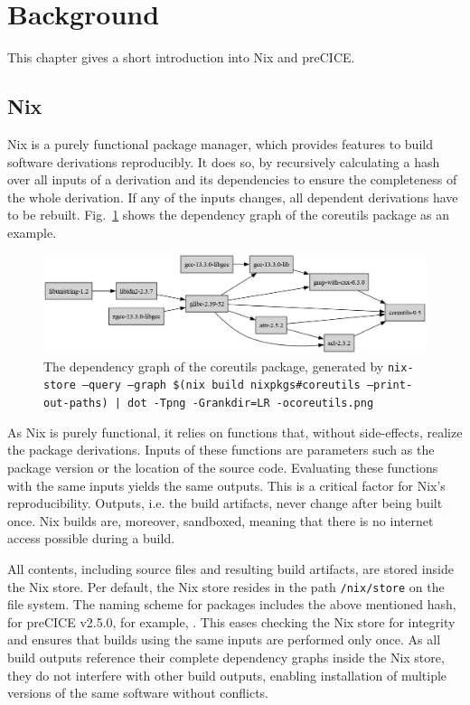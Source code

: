 \documentclass{eceasst}
\begin{document}
\section{Background}
\label{sec:background}

This chapter gives a short introduction into Nix and preCICE.

\subsection{Nix}\label{sec:nix}

Nix is a purely functional package manager, which provides features to build software derivations reproducibly.
It does so, by recursively calculating a hash over all inputs of a derivation and its dependencies to ensure the completeness of the whole derivation.
If any of the inputs changes, all dependent derivations have to be rebuilt.
Fig.~\ref{fig:nix-graph} shows the dependency graph of the coreutils package as an example.

\begin{figure}
    \centering
    \includegraphics[width=1\textwidth]{figures/coreutils.png}
    \caption{The dependency graph of the coreutils package, generated by \texttt{nix-store --query --graph \$(nix build nixpkgs\#coreutils --print-out-paths) | dot -Tpng -Grankdir=LR -ocoreutils.png}}
    \label{fig:nix-graph}
\end{figure}

As Nix is purely functional, it relies on functions that, without side-effects, realize the package derivations.
Inputs of these functions are parameters such as the package version or the location of the source code.
Evaluating these functions with the same inputs yields the same outputs.
This is a critical factor for Nix's reproducibility.
Outputs, i.e. the build artifacts, never change after being built once.
Nix builds are, moreover, sandboxed, meaning that there is no internet access possible during a build.

All contents, including source files and resulting build artifacts, are stored inside the Nix store.
Per default, the Nix store resides in the path \texttt{/nix/store} on the file system.
The naming scheme for packages includes the above mentioned hash, for preCICE v2.5.0, for example,
.
This eases checking the Nix store for integrity and ensures that builds using the same inputs are performed only once.
As all build outputs reference their complete dependency graphs inside the Nix store, they do not interfere with other build outputs, enabling installation of multiple versions of the same software without conflicts.
\end{document}
